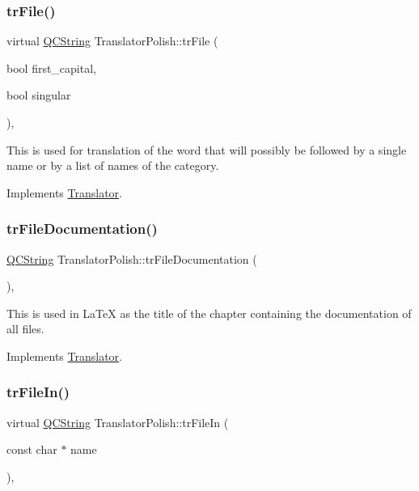 \subsubsection{\texorpdfstring{trFile()}{trFile()}}
{\footnotesize\ttfamily virtual \mbox{\hyperlink{class_q_c_string}{Q\+C\+String}} Translator\+Polish\+::tr\+File (\begin{DoxyParamCaption}\item[{bool}]{first\+\_\+capital,  }\item[{bool}]{singular }\end{DoxyParamCaption})\hspace{0.3cm}{\ttfamily [inline]}, {\ttfamily [virtual]}}

This is used for translation of the word that will possibly be followed by a single name or by a list of names of the category. 

Implements \mbox{\hyperlink{class_translator}{Translator}}.

\mbox{\label{class_translator_polish_a7e86660e9e6797d66cd8f7513dda1f2d}} 
\subsubsection{\texorpdfstring{trFileDocumentation()}{trFileDocumentation()}}
{\footnotesize\ttfamily \mbox{\hyperlink{class_q_c_string}{Q\+C\+String}} Translator\+Polish\+::tr\+File\+Documentation (\begin{DoxyParamCaption}{ }\end{DoxyParamCaption})\hspace{0.3cm}{\ttfamily [inline]}, {\ttfamily [virtual]}}

This is used in La\+TeX as the title of the chapter containing the documentation of all files. 

Implements \mbox{\hyperlink{class_translator}{Translator}}.

\mbox{\label{class_translator_polish_a24b192a77da4973ff6826d3f695732f2}} 
\subsubsection{\texorpdfstring{trFileIn()}{trFileIn()}}
{\footnotesize\ttfamily virtual \mbox{\hyperlink{class_q_c_string}{Q\+C\+String}} Translator\+Polish\+::tr\+File\+In (\begin{DoxyParamCaption}\item[{const char $\ast$}]{name }\end{DoxyParamCaption})\hspace{0.3cm}{\ttfamily [inline]}, {\ttfamily [virtual]}}


